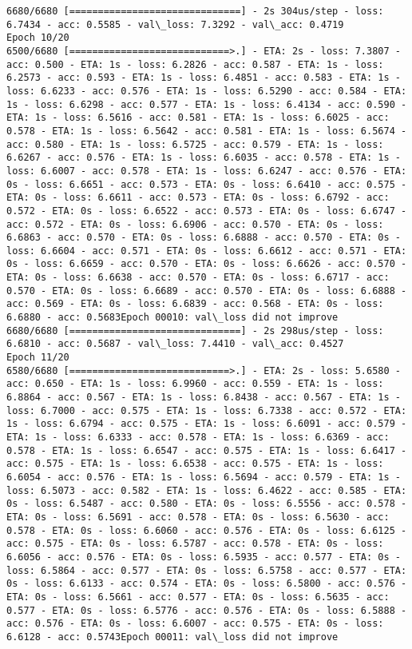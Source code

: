 \documentclass[11pt]{article}
\begin{document}
\begin{Verbatim}[commandchars=\\\{\}]
6680/6680 [==============================] - 2s 304us/step - loss: 6.7434 - acc: 0.5585 - val\_loss: 7.3292 - val\_acc: 0.4719
Epoch 10/20
6500/6680 [============================>.] - ETA: 2s - loss: 7.3807 - acc: 0.500 - ETA: 1s - loss: 6.2826 - acc: 0.587 - ETA: 1s - loss: 6.2573 - acc: 0.593 - ETA: 1s - loss: 6.4851 - acc: 0.583 - ETA: 1s - loss: 6.6233 - acc: 0.576 - ETA: 1s - loss: 6.5290 - acc: 0.584 - ETA: 1s - loss: 6.6298 - acc: 0.577 - ETA: 1s - loss: 6.4134 - acc: 0.590 - ETA: 1s - loss: 6.5616 - acc: 0.581 - ETA: 1s - loss: 6.6025 - acc: 0.578 - ETA: 1s - loss: 6.5642 - acc: 0.581 - ETA: 1s - loss: 6.5674 - acc: 0.580 - ETA: 1s - loss: 6.5725 - acc: 0.579 - ETA: 1s - loss: 6.6267 - acc: 0.576 - ETA: 1s - loss: 6.6035 - acc: 0.578 - ETA: 1s - loss: 6.6007 - acc: 0.578 - ETA: 1s - loss: 6.6247 - acc: 0.576 - ETA: 0s - loss: 6.6651 - acc: 0.573 - ETA: 0s - loss: 6.6410 - acc: 0.575 - ETA: 0s - loss: 6.6611 - acc: 0.573 - ETA: 0s - loss: 6.6792 - acc: 0.572 - ETA: 0s - loss: 6.6522 - acc: 0.573 - ETA: 0s - loss: 6.6747 - acc: 0.572 - ETA: 0s - loss: 6.6906 - acc: 0.570 - ETA: 0s - loss: 6.6863 - acc: 0.570 - ETA: 0s - loss: 6.6888 - acc: 0.570 - ETA: 0s - loss: 6.6604 - acc: 0.571 - ETA: 0s - loss: 6.6612 - acc: 0.571 - ETA: 0s - loss: 6.6659 - acc: 0.570 - ETA: 0s - loss: 6.6626 - acc: 0.570 - ETA: 0s - loss: 6.6638 - acc: 0.570 - ETA: 0s - loss: 6.6717 - acc: 0.570 - ETA: 0s - loss: 6.6689 - acc: 0.570 - ETA: 0s - loss: 6.6888 - acc: 0.569 - ETA: 0s - loss: 6.6839 - acc: 0.568 - ETA: 0s - loss: 6.6880 - acc: 0.5683Epoch 00010: val\_loss did not improve
6680/6680 [==============================] - 2s 298us/step - loss: 6.6810 - acc: 0.5687 - val\_loss: 7.4410 - val\_acc: 0.4527
Epoch 11/20
6580/6680 [============================>.] - ETA: 2s - loss: 5.6580 - acc: 0.650 - ETA: 1s - loss: 6.9960 - acc: 0.559 - ETA: 1s - loss: 6.8864 - acc: 0.567 - ETA: 1s - loss: 6.8438 - acc: 0.567 - ETA: 1s - loss: 6.7000 - acc: 0.575 - ETA: 1s - loss: 6.7338 - acc: 0.572 - ETA: 1s - loss: 6.6794 - acc: 0.575 - ETA: 1s - loss: 6.6091 - acc: 0.579 - ETA: 1s - loss: 6.6333 - acc: 0.578 - ETA: 1s - loss: 6.6369 - acc: 0.578 - ETA: 1s - loss: 6.6547 - acc: 0.575 - ETA: 1s - loss: 6.6417 - acc: 0.575 - ETA: 1s - loss: 6.6538 - acc: 0.575 - ETA: 1s - loss: 6.6054 - acc: 0.576 - ETA: 1s - loss: 6.5694 - acc: 0.579 - ETA: 1s - loss: 6.5073 - acc: 0.582 - ETA: 1s - loss: 6.4622 - acc: 0.585 - ETA: 0s - loss: 6.5487 - acc: 0.580 - ETA: 0s - loss: 6.5556 - acc: 0.578 - ETA: 0s - loss: 6.5691 - acc: 0.578 - ETA: 0s - loss: 6.5630 - acc: 0.578 - ETA: 0s - loss: 6.6060 - acc: 0.576 - ETA: 0s - loss: 6.6125 - acc: 0.575 - ETA: 0s - loss: 6.5787 - acc: 0.578 - ETA: 0s - loss: 6.6056 - acc: 0.576 - ETA: 0s - loss: 6.5935 - acc: 0.577 - ETA: 0s - loss: 6.5864 - acc: 0.577 - ETA: 0s - loss: 6.5758 - acc: 0.577 - ETA: 0s - loss: 6.6133 - acc: 0.574 - ETA: 0s - loss: 6.5800 - acc: 0.576 - ETA: 0s - loss: 6.5661 - acc: 0.577 - ETA: 0s - loss: 6.5635 - acc: 0.577 - ETA: 0s - loss: 6.5776 - acc: 0.576 - ETA: 0s - loss: 6.5888 - acc: 0.576 - ETA: 0s - loss: 6.6007 - acc: 0.575 - ETA: 0s - loss: 6.6128 - acc: 0.5743Epoch 00011: val\_loss did not improve

\end{Verbatim}
\end{document}
